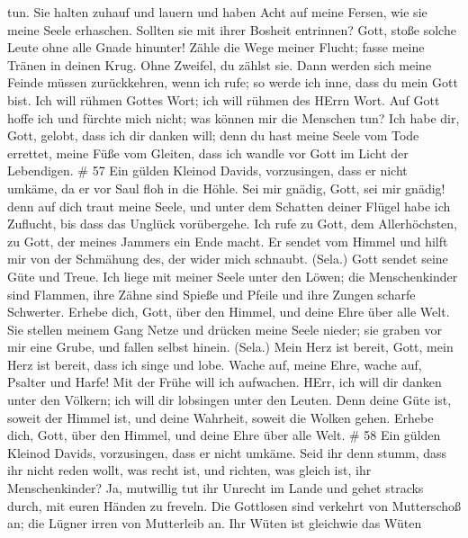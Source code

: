 tun.  Sie halten zuhauf und lauern und haben Acht auf meine
Fersen, wie sie meine Seele erhaschen.  Sollten sie mit
ihrer Bosheit entrinnen? Gott, stoße solche Leute ohne alle Gnade
hinunter!  Zähle die Wege meiner Flucht; fasse meine Tränen
in deinen Krug. Ohne Zweifel, du zählst sie.  Dann werden
sich meine Feinde müssen zurückkehren, wenn ich rufe; so werde ich inne,
dass du mein Gott bist.  Ich will rühmen Gottes Wort; ich
will rühmen des HErrn Wort.  Auf Gott hoffe ich und fürchte
mich nicht; was können mir die Menschen tun?  Ich habe dir,
Gott, gelobt, dass ich dir danken will;  denn du hast meine
Seele vom Tode errettet, meine Füße vom Gleiten, dass ich wandle vor
Gott im Licht der Lebendigen. \# 57  Ein gülden Kleinod
Davids, vorzusingen, dass er nicht umkäme, da er vor Saul floh in die
Höhle.  Sei mir gnädig, Gott, sei mir gnädig! denn auf dich
traut meine Seele, und unter dem Schatten deiner Flügel habe ich
Zuflucht, bis dass das Unglück vorübergehe.  Ich rufe zu
Gott, dem Allerhöchsten, zu Gott, der meines Jammers ein Ende macht.
 Er sendet vom Himmel und hilft mir von der Schmähung des,
der wider mich schnaubt. (Sela.) Gott sendet seine Güte und Treue.
 Ich liege mit meiner Seele unter den Löwen; die
Menschenkinder sind Flammen, ihre Zähne sind Spieße und Pfeile und ihre
Zungen scharfe Schwerter.  Erhebe dich, Gott, über den
Himmel, und deine Ehre über alle Welt.  Sie stellen meinem
Gang Netze und drücken meine Seele nieder; sie graben vor mir eine
Grube, und fallen selbst hinein. (Sela.)  Mein Herz ist
bereit, Gott, mein Herz ist bereit, dass ich singe und lobe.
 Wache auf, meine Ehre, wache auf, Psalter und Harfe! Mit
der Frühe will ich aufwachen.  HErr, ich will dir danken
unter den Völkern; ich will dir lobsingen unter den Leuten.
 Denn deine Güte ist, soweit der Himmel ist, und deine
Wahrheit, soweit die Wolken gehen.  Erhebe dich, Gott, über
den Himmel, und deine Ehre über alle Welt. \# 58  Ein gülden
Kleinod Davids, vorzusingen, dass er nicht umkäme.  Seid ihr
denn stumm, dass ihr nicht reden wollt, was recht ist, und richten, was
gleich ist, ihr Menschenkinder?  Ja, mutwillig tut ihr
Unrecht im Lande und gehet stracks durch, mit euren Händen zu freveln.
 Die Gottlosen sind verkehrt von Mutterschoß an; die Lügner
irren von Mutterleib an.  Ihr Wüten ist gleichwie das Wüten
